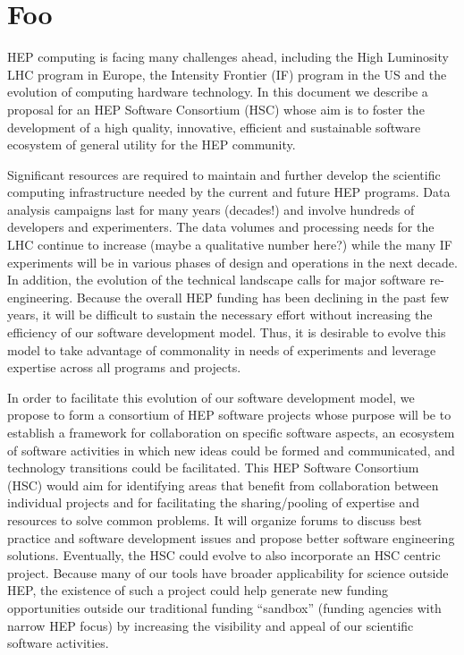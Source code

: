 \documentclass[12pt,letterpaper,fleqn]{article}
\begin{document}
\linenumbers

\section{Foo}
\label{sec:intro}

HEP computing is facing many challenges ahead, including the High
Luminosity LHC program in Europe, the Intensity Frontier (IF) program
in the US and the evolution of computing hardware technology. In
this document we describe a proposal for an HEP Software Consortium
(HSC) whose aim is to foster the development of a high quality,
innovative, efficient and sustainable software ecosystem of general
utility for the HEP community.

Significant resources are required to maintain and further develop
the scientific computing infrastructure needed by the current and
future HEP programs.  Data analysis campaigns last for many years
(decades!) and involve hundreds of developers and experimenters.
The data volumes and processing needs for the LHC continue to
increase (maybe a qualitative number here?) while the many IF
experiments will be in various phases of design and operations in
the next decade.  In addition, the evolution of the technical
landscape calls for major software re-engineering.  Because the
overall HEP funding has been declining in the past few years, it
will be difficult to sustain the necessary effort without increasing
the efficiency of our software development model.   Thus, it is
desirable to evolve this model to take advantage of commonality in
needs of experiments and leverage expertise across all programs and
projects.

In order to facilitate this evolution of our software development model, we propose to form a consortium of HEP software projects whose purpose will be to establish a framework for collaboration on specific software aspects, an ecosystem of software activities in which new ideas could be formed and communicated, and technology transitions could be facilitated.  This HEP Software Consortium (HSC) would aim for identifying areas that benefit from collaboration between individual projects and for facilitating the sharing/pooling of expertise and resources to solve common problems.  It will organize forums to discuss best practice and software development issues and propose better software engineering solutions.  Eventually, the HSC could evolve to also incorporate an HSC centric project.  Because many of our tools have broader applicability for science outside HEP, the existence of such a project could help generate new funding opportunities outside our traditional funding “sandbox” (funding agencies with narrow HEP focus) by increasing the visibility and appeal of our scientific software activities.
\end{document}
